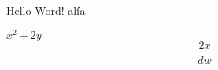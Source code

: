 \documentclass[11pt]{article}
\begin{document}
Hello Word!
    alfa

$x^2+2y$ $$\frac{2x}{dw}$$
\end{document}
